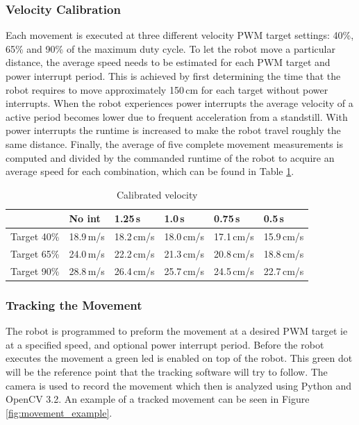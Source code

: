 \subsubsection{Velocity Calibration}

Each movement is executed at three different velocity PWM target settings: 40\%, 65\% and 90\% of the maximum duty cycle.
To let the robot move a particular distance, the average speed needs to be estimated for each PWM target and power interrupt period.
This is achieved by first determining the time that the robot requires to move approximately 150\,cm for each target without power interrupts.
When the robot experiences power interrupts the average velocity of a active period becomes lower due to frequent acceleration from a standstill.
With power interrupts the runtime is increased to make the robot travel roughly the same distance.
Finally, the average of five complete movement measurements is computed and divided by the commanded runtime of the robot to acquire an average speed for each combination, which can be found in Table \ref{tab:val_calib}.


\begin{table}[t]
	\centering
	\small
	\caption{Calibrated velocity}
	\label{tab:val_calib}
	\begin{tabular}{|l|l|l|l|l|l|}
		\hline
		& No int & 1.25\,s & 1.0\,s & 0.75\,s & 0.5\,s \\
		\hline \hline
		Target 40\% & 18.9\,m/s & 18.2\,cm/s & 18.0\,cm/s & 17.1\,cm/s & 15.9\,cm/s \\
		Target 65\% & 24.0\,m/s & 22.2\,cm/s & 21.3\,cm/s & 20.8\,cm/s & 18.8\,cm/s \\
		Target 90\% & 28.8\,m/s & 26.4\,cm/s & 25.7\,cm/s & 24.5\,cm/s & 22.7\,cm/s \\
		\hline
	\end{tabular}
\end{table}

\subsubsection{Tracking the Movement}

The robot is programmed to preform the movement at a desired PWM target ie at a specified speed, and optional power interrupt period.
Before the robot executes the movement a green led is enabled on top of the robot.
This green dot will be the reference point that the tracking software will try to follow.
The camera is used to record the movement which then is analyzed using Python and OpenCV 3.2.
An example of a tracked movement can be seen in Figure \ref{fig:movement_example}.

